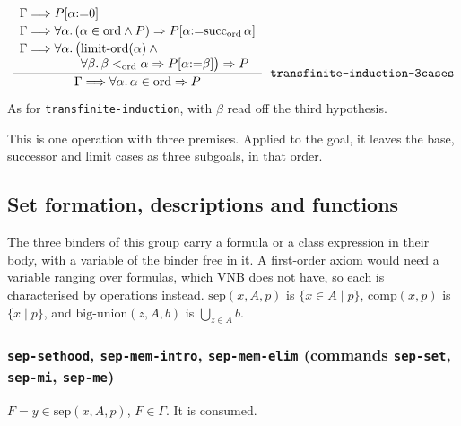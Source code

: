 \label{kop:transfinite-induction-3cases}%
\[
\frac{\displaystyle
  \begin{array}{l}
  \Gamma \Longrightarrow P[\alpha{:=}0] \\[2pt]
  \Gamma \Longrightarrow \forall \alpha.\,
    (\alpha \in \mathrm{ord} \wedge P) \Rightarrow P[\alpha{:=}\mathrm{succ}_{\mathrm{ord}}\,\alpha] \\[2pt]
  \Gamma \Longrightarrow \forall \alpha.\,
    \bigl(\mathrm{limit\text{-}ord}(\alpha) \wedge {} \\
  \hphantom{\Gamma \Longrightarrow \forall \alpha.\,\bigl(}
          \forall \beta.\, \beta <_{\mathrm{ord}} \alpha \Rightarrow P[\alpha{:=}\beta]\bigr)
    \Rightarrow P
  \end{array}}
 {\displaystyle \Gamma \Longrightarrow \forall \alpha.\, \alpha \in \mathrm{ord} \Rightarrow P}
\;\;\mbox{\texttt{transfinite-induction-3cases}}
\]
\begin{VNBcond}
\item[Freshness] As for \texttt{transfinite-induction}, with $\beta$ read
  off the third hypothesis.
\end{VNBcond}
This is one operation with three premises.  Applied to the goal, it
leaves the base, successor and limit cases as three subgoals, in that
order.

\subsection{Set formation, descriptions and functions}

The three binders of this group carry a formula or a class expression in
their body, with a variable of the binder free in it.  A first-order
axiom would need a variable ranging over formulas, which VNB does not
have, so each is characterised by operations instead.
$\mathrm{sep}(x, A, p)$ is $\{x \in A \mid p\}$,
$\mathrm{comp}(x, p)$ is $\{x \mid p\}$, and
$\mathrm{big\text{-}union}(z, A, b)$ is $\bigcup_{z \in A} b$.

\subsubsection*{\texttt{sep-sethood}, \texttt{sep-mem-intro},
  \texttt{sep-mem-elim}
  (commands \texttt{sep-set}, \texttt{sep-mi}, \texttt{sep-me})}

\label{kop:sep-sethood}%
\label{kop:sep-mem-intro}%
\label{kop:sep-mem-elim}%
\begin{VNBcond}
\item[Assumption] $F = y \in \mathrm{sep}(x,A,p)$, $F \in \Gamma$.  It
  is consumed.
\end{VNBcond}

